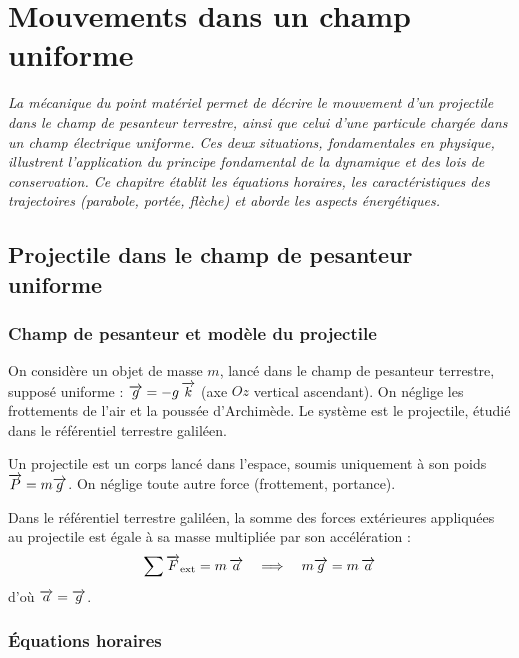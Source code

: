 \chapter{Mouvements dans un champ uniforme}

\textit{La mécanique du point matériel permet de décrire le mouvement d’un projectile dans le champ de pesanteur terrestre, ainsi que celui d’une particule chargée dans un champ électrique uniforme. Ces deux situations, fondamentales en physique, illustrent l’application du principe fondamental de la dynamique et des lois de conservation. Ce chapitre établit les équations horaires, les caractéristiques des trajectoires (parabole, portée, flèche) et aborde les aspects énergétiques.}

\section{Projectile dans le champ de pesanteur uniforme}

\subsection{Champ de pesanteur et modèle du projectile}

On considère un objet de masse $m$, lancé dans le champ de pesanteur terrestre, supposé uniforme : $\overrightarrow{g} = -g\,\overrightarrow{k}$ (axe $Oz$ vertical ascendant). On néglige les frottements de l’air et la poussée d’Archimède. Le système est le projectile, étudié dans le référentiel terrestre galiléen.

\begin{definition}[Projectile]
Un projectile est un corps lancé dans l’espace, soumis uniquement à son poids $\overrightarrow{P}=m\overrightarrow{g}$. On néglige toute autre force (frottement, portance).
\end{definition}

\begin{loi}
Dans le référentiel terrestre galiléen, la somme des forces extérieures appliquées au projectile est égale à sa masse multipliée par son accélération :
\[
\sum \overrightarrow{F}_{\text{ext}} = m\,\overrightarrow{a} \quad\Longrightarrow\quad m\overrightarrow{g} = m\,\overrightarrow{a}
\]
d’où $\overrightarrow{a} = \overrightarrow{g}$.
\end{loi}

\subsection{Équations horaires}

